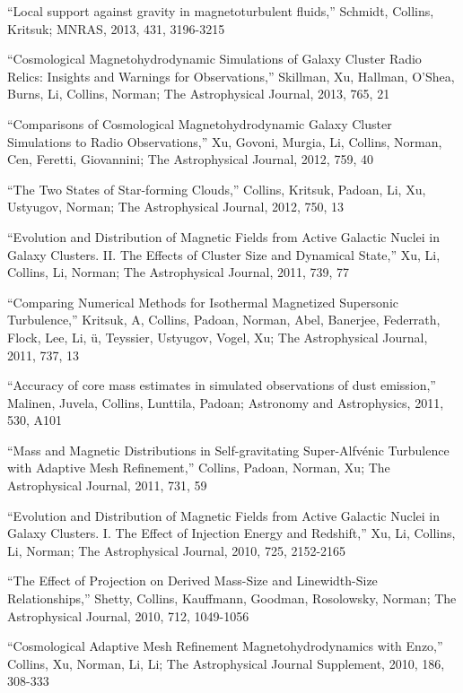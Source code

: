\medskip
\noindent ``Local support against gravity in magnetoturbulent fluids,''
Schmidt, Collins, Kritsuk;
MNRAS,
 2013,
431,
3196-3215

\medskip
\noindent ``Cosmological Magnetohydrodynamic Simulations of Galaxy Cluster Radio Relics: Insights and Warnings for Observations,''
Skillman, Xu, Hallman, O'Shea, Burns, Li, Collins, Norman;
The Astrophysical Journal,
 2013,
765,
21

\medskip
\noindent ``Comparisons of Cosmological Magnetohydrodynamic Galaxy Cluster Simulations to Radio Observations,''
Xu, Govoni, Murgia, Li, Collins, Norman, Cen, Feretti, Giovannini;
The Astrophysical Journal,
 2012,
759,
40

\medskip
\noindent ``The Two States of Star-forming Clouds,''
Collins, Kritsuk, Padoan, Li, Xu, Ustyugov, Norman;
The Astrophysical Journal,
 2012,
750,
13

\medskip
\noindent ``Evolution and Distribution of Magnetic Fields from Active Galactic Nuclei in Galaxy Clusters. II. The Effects of Cluster Size and Dynamical State,''
Xu, Li, Collins, Li, Norman;
The Astrophysical Journal,
 2011,
739,
77

\medskip
\noindent ``Comparing Numerical Methods for Isothermal Magnetized Supersonic Turbulence,''
Kritsuk, A, Collins, Padoan, Norman, Abel, Banerjee, Federrath, Flock, Lee, Li, \"u, Teyssier, Ustyugov, Vogel, Xu;
The Astrophysical Journal,
 2011,
737,
13

\medskip
\noindent ``Accuracy of core mass estimates in simulated observations of dust emission,''
Malinen, Juvela, Collins, Lunttila, Padoan;
Astronomy and Astrophysics,
 2011,
530,
A101

\medskip
\noindent ``Mass and Magnetic Distributions in Self-gravitating Super-Alfv{\'e}nic Turbulence with Adaptive Mesh Refinement,''
Collins, Padoan, Norman, Xu;
The Astrophysical Journal,
 2011,
731,
59

\medskip
\noindent ``Evolution and Distribution of Magnetic Fields from Active Galactic Nuclei in Galaxy Clusters. I. The Effect of Injection Energy and Redshift,''
Xu, Li, Collins, Li, Norman;
The Astrophysical Journal,
 2010,
725,
2152-2165

\medskip
\noindent ``The Effect of Projection on Derived Mass-Size and Linewidth-Size Relationships,''
Shetty, Collins, Kauffmann, Goodman, Rosolowsky, Norman;
The Astrophysical Journal,
 2010,
712,
1049-1056

\medskip
\noindent ``Cosmological Adaptive Mesh Refinement Magnetohydrodynamics with Enzo,''
Collins, Xu, Norman, Li, Li;
The Astrophysical Journal Supplement,
 2010,
186,
308-333

